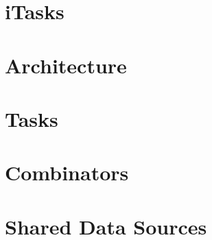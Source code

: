 
\section{iTasks}
\section{Architecture}
\section{Tasks}
\section{Combinators}
\section{Shared Data Sources}